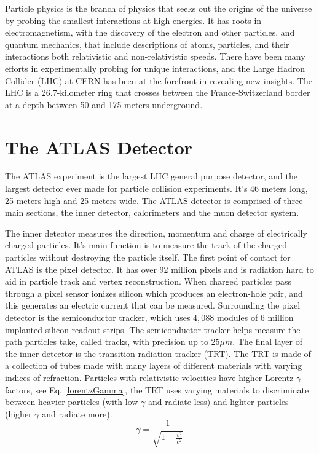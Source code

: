 Particle physics is the branch of physics that seeks out the origins of the universe by probing the smallest interactions at high energies.
It has roots in electromagnetism, with the discovery of the electron and other particles, and quantum mechanics, that include descriptions of atoms, particles, and their interactions both relativistic and non-relativistic speeds. 
There have been many efforts in experimentally probing for unique interactions, and the Large Hadron Collider (LHC) at CERN has been at the forefront in revealing new insights.  
The LHC is a 26.7-kilometer ring that crosses between the France-Switzerland border at a depth between 50 and 175 meters underground.\cite{LHC_faq_guide}


\section{The ATLAS Detector}

The ATLAS experiment is the largest LHC general purpose detector, and the largest detector ever made for particle collision experiments. 
It's 46 meters long, 25 meters high and 25 meters wide.\cite{ATLAS_Fact_Sheet}
The ATLAS detector is comprised of three main sections, the inner detector, calorimeters and the muon detector system. 

The inner detector measures the direction, momentum and charge of electrically charged particles.
It's main function is to measure the track of the charged particles without destroying the particle itself.
The first point of contact for ATLAS is the pixel detector. 
It has over 92 million pixels and is radiation hard to aid in particle track and vertex reconstruction.\cite{Hugging2006}
When charged particles pass through a pixel sensor ionizes silicon which produces an electron-hole pair, and this generates an electric current that can be measured. \cite{Giangiacomi:2684079}
Surrounding the pixel detector is the semiconductor tracker, which uses $4,088$ modules of 6 million implanted silicon readout strips.
The semiconductor tracker helps measure the path particles take, called tracks, with precision up to $25\mu m$. 
The final layer of the inner detector is the transition radiation tracker (TRT). 
The TRT is made of a collection of tubes made with many layers of different materials with varying indices of refraction.  
Particles with relativistic velocities have higher Lorentz $\gamma$-factors, see Eq. \eqref{lorentzGamma}, the TRT uses varying materials to discriminate between heavier particles (with low $\gamma$ and radiate less) and lighter particles (higher $\gamma$ and radiate more). \cite{Mindur:2139567}
\begin{equation}\label{lorentzGamma}
    \gamma = \frac{1}{\sqrt{1 - \frac{v^2}{c^2}}}
\end{equation}

